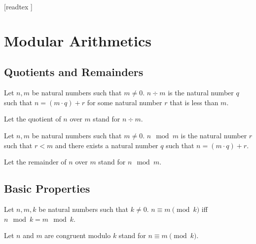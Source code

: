 \documentclass[10pt]{article}
\begin{document}
  \begin{imports}
    \begin{forthel}
      [readtex ]
    \end{forthel}
  \end{imports}


  \section*{Modular Arithmetics}

  \subsection*{Quotients and Remainders}

  \begin{forthel}
    \begin{definition}
      Let $n, m$ be natural numbers such that $m \neq 0$.
      $n \div m$ is the natural number $q$ such that $n = (m \cdot q) + r$ for some natural number $r$ that is less than $m$.
    \end{definition}

    Let the quotient of $n$ over $m$ stand for $n \div m$.
  \end{forthel}

  \begin{forthel}
    \begin{definition}
      Let $n, m$ be natural numbers such that $m \neq 0$.
      $n \mod m$ is the natural number $r$ such that $r < m$ and there exists a natural number $q$ such that $n = (m \cdot q) + r$.
    \end{definition}

    Let the remainder of $n$ over $m$ stand for $n \mod m$.
  \end{forthel}


  \subsection*{Basic Properties}

  \begin{forthel}
    \begin{definition}
      Let $n, m, k$ be natural numbers such that $k \neq 0$.
      $n \equiv m \pmod{k}$ iff $n \mod k = m \mod k$.
    \end{definition}

    Let $n$ and $m$ are congruent modulo $k$ stand for $n \equiv m \pmod{k}$.
  \end{forthel}
\end{document}
